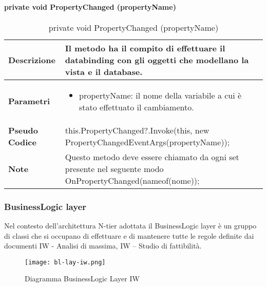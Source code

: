 \paragraph{private void PropertyChanged (propertyName)}
        \begin{center}
            \begin{longtable}{|p{3cm}|p{9cm}|}%
            \caption{private void PropertyChanged (propertyName)}
            \endfirsthead
            \endhead
            \hline
            \textbf{Descrizione} & Il metodo ha il compito di effettuare il databinding con gli oggetti che modellano la vista e il database.\\
            \hline
            \textbf{Parametri} &      
            \begin{itemize}
                \item propertyName: il nome della variabile a cui è stato effettuato il cambiamento.
            \end{itemize}
            \\
            \hline
            \textbf{Pseudo Codice} & 
            this.PropertyChanged?.Invoke(this, 
                new PropertyChangedEventArgs(propertyName));\newline
            \\
            \hline
            \textbf{Note} & 
            Questo metodo deve essere chiamato da ogni set presente nel seguente modo 
            OnPropertyChanged(nameof(nome));
            \\
            \hline
            \end{longtable}
            \end{center}






\subsubsection{BusinessLogic layer}
Nel contesto dell’architettura N-tier adottata il BusinessLogic layer è un gruppo di classi che si occupano di effettuare e di mantenere tutte le regole definite dai documenti IW - Analisi di massima, IW – Studio di fattibilità.  

\begin{figure}[htbp]
    \centering
    \texttt{[image: bl-lay-iw.png]} 
    \caption{Diagramma BusinessLogic Layer IW}
    \label{fig:bl-lay-iw} 
\end{figure}

